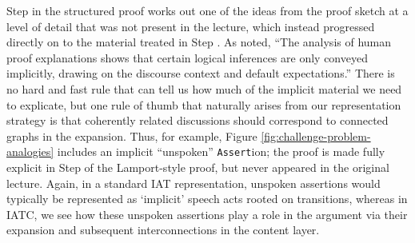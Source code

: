 \documentclass[smallextended,oneside]{svjour3}       %
\begin{document}
Step  in the structured proof works out one of the ideas from the proof sketch at a
level of detail that was not present in the lecture, which instead
progressed directly on to the material treated in Step .  As
\citet[p.~69]{fiedler2007argumentation} noted, ``The analysis of human
proof explanations shows that certain logical inferences are only
conveyed implicitly, drawing on the discourse context and default
expectations.'' There is no hard and fast rule that can tell us how
much of the implicit material we need to explicate, but one rule of thumb
that naturally arises from our representation strategy is that coherently
related discussions should correspond to connected graphs in the expansion.
Thus, for example, Figure \ref{fig:challenge-problem-analogies} includes an
implicit ``unspoken'' \texttt{Assert}ion; the proof is made fully
explicit in Step  of the Lamport-style proof, but never
appeared in the original lecture.  Again, in a standard
IAT representation, unspoken assertions would typically be represented as
`implicit' speech acts rooted on transitions, whereas in IATC, we see how
these unspoken assertions play a role in the argument via their expansion
and subsequent interconnections in the content layer.
\end{document}
